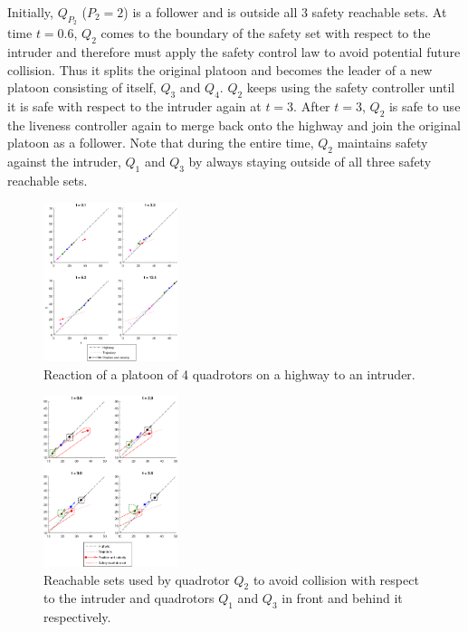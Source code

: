 Initially, $Q_{P_2}$ ($P_2=2$) is a follower and is outside all 3 safety reachable sets. At time $t=0.6$, $Q_2$ comes to the boundary of the safety set with respect to the intruder and therefore must apply the safety control law to avoid potential future collision. Thus it splits the original platoon and becomes the leader of a new platoon consisting of itself, $Q_3$ and $Q_4$. $Q_2$ keeps using the safety controller until it is safe with respect to the intruder again at $t=3$. After $t=3$, $Q_2$ is safe to use the liveness controller again to merge back onto the highway and join the original platoon as a follower. Note that during the entire time, $Q_2$ maintains safety against the intruder, $Q_1$ and $Q_3$ by always staying outside of all three safety reachable sets.


\begin{figure}
	\centering
	\includegraphics[width=0.35\textwidth]{"fig/Intruder1"}
	\caption{Reaction of a platoon of 4 quadrotors on a highway to an intruder.}
	\label{fig:intruder1}
\end{figure}

\begin{figure}
	\centering
		\includegraphics[width=0.35\textwidth]{"fig/intruder2"}
	\caption{Reachable sets used by quadrotor $Q_2$ to avoid collision with respect to the intruder and quadrotors $Q_1$ and $Q_3$ in front and behind it respectively.}
	\label{fig:intruder2}
\end{figure}

